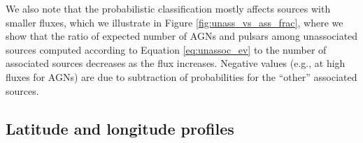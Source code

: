 We also note that the probabilistic classification mostly affects sources with smaller fluxes,
which we illustrate in Figure \ref{fig:unass_vs_ass_frac}, where we show that the ratio of expected number of AGNs and pulsars among unassociated sources computed according to Equation \ref{eq:unassoc_ev} to the number of associated sources decreases as the flux increases.
Negative values (e.g., at high fluxes for AGNs) are due to subtraction of probabilities for the ``other'' associated sources.

\subsection{Latitude and longitude profiles}

